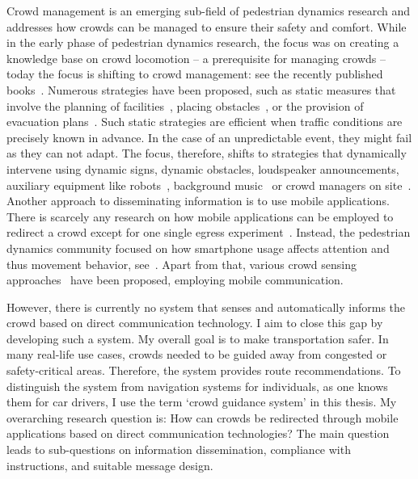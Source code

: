 Crowd management is an emerging sub-field of pedestrian dynamics research and addresses how crowds can be managed to ensure their safety and comfort. 
While in the early phase of pedestrian dynamics research, the focus was on creating a knowledge base on crowd locomotion -- a prerequisite for managing crowds -- today the focus  is shifting to crowd management: see the recently published books~\cite{otoole-2019-cdyn,silvers-2020-cdyn,feliciani-2021-cdyn,still-2021-cdyn}.
Numerous strategies have been proposed, such as static measures that involve the planning of facilities~\cite{seriani-2015-cdyn,kaakai-2007-cdyn}, placing obstacles~\cite{johansson-2007b-cdyn}, or the provision of evacuation plans~\cite{abdelghany-2014-cdyn}. Such static strategies are efficient when traffic conditions are precisely known in advance. In the case of an unpredictable event, they might fail as they can not adapt. The focus, therefore, shifts to strategies that dynamically intervene using dynamic signs, dynamic obstacles, loudspeaker announcements, auxiliary equipment like robots~\cite{zhou-2019-cdyn}, background music~\cite{zeng-2019-cdyn} or crowd managers on site~\cite{feliciani-2020b-cdyn}.
Another approach to disseminating information is to use mobile applications. There is scarcely any research on how mobile applications can be employed to redirect a crowd except for one single egress experiment~\cite{feliciani-2020-cdyn}. Instead, the pedestrian dynamics community focused on how smartphone usage affects attention and thus movement behavior, see~\cite{echeverria-2023-cdyn,jiang-2018b-cdyn}. 
Apart from that, various crowd sensing approaches~\cite{ribeiro-2023-com,felemban-2014-com,felemban-2020-com,felemban-2021-com,torkamandi-2022-com} have been proposed, employing mobile communication.

However, there is currently no system that senses and automatically informs the crowd based on direct communication technology. I aim to close this gap by developing such a system. My overall goal is to make transportation safer. In many real-life use cases, crowds needed to be guided away from congested or safety-critical areas. Therefore, the system provides route recommendations. To distinguish the system from  navigation systems for individuals, as one knows them for car drivers, I use the term `crowd guidance system' in this thesis. My overarching research question is: How can crowds be redirected through mobile applications based on direct communication technologies? The main question leads to sub-questions on information dissemination, compliance with instructions, and suitable message design.



